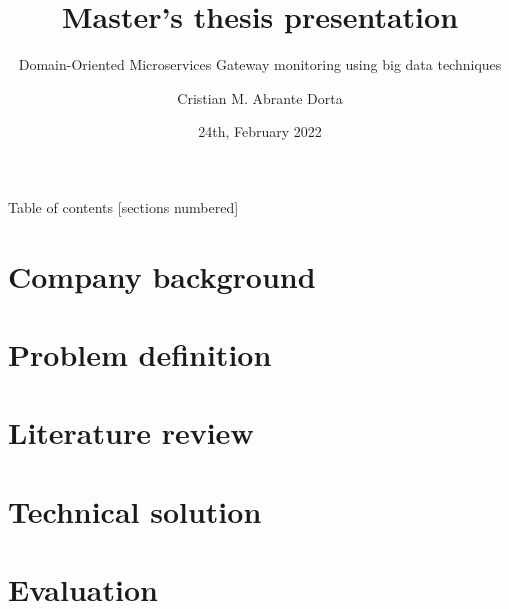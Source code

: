 \documentclass[10pt]{beamer}
\title{Master's thesis presentation}
\subtitle{Domain-Oriented Microservices Gateway monitoring using big data techniques}
\date{24th, February 2022}
\author{Cristian M. Abrante Dorta}
\institute{Aalto University \& Unity Technologies}
\begin{document}
\maketitle

\begin{frame}{Table of contents}
  [sections numbered]
  \tableofcontents%
\end{frame}

\section{Company background}


\section{Problem definition}


\section{Literature review}


\section{Technical solution}


\section{Evaluation}
\end{document}
